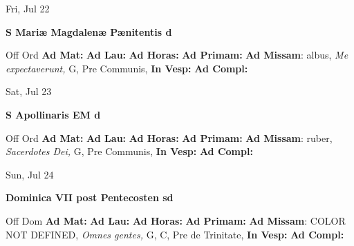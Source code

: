\documentclass[10pt]{memoir}
\begin{document}
\begin{center}
\begin{minipage}{3.5in}
\vspace{2em}
\begin{center}Fri, Jul 22
\end{center}
\textbf{ \large S Mariæ Magdalenæ Pænitentis
\textnormal{\normalsize d}}

\begin{justify}Off Ord
\textbf{Ad Mat: }
\textbf{Ad Lau: }
\textbf{Ad Horas: }
\textbf{Ad Primam: }\textbf{Ad Missam}: albus, \textit{Me expectaverunt,} G, Pre Communis, 
\textbf{In Vesp: }
\textbf{Ad Compl: }
\end{justify}
\end{minipage}
\end{center}

\begin{center}
\begin{minipage}{3.5in}
\vspace{2em}
\begin{center}Sat, Jul 23
\end{center}
\textbf{ \large S Apollinaris EM
\textnormal{\normalsize d}}

\begin{justify}Off Ord
\textbf{Ad Mat: }
\textbf{Ad Lau: }
\textbf{Ad Horas: }
\textbf{Ad Primam: }\textbf{Ad Missam}: ruber, \textit{Sacerdotes Dei,} G, Pre Communis, 
\textbf{In Vesp: }
\textbf{Ad Compl: }
\end{justify}
\end{minipage}
\end{center}

\begin{center}
\begin{minipage}{3.5in}
\vspace{2em}
\begin{center}Sun, Jul 24
\end{center}
\textbf{ \large Dominica VII post Pentecosten
\textnormal{\normalsize sd}}

\begin{justify}Off Dom
\textbf{Ad Mat: }
\textbf{Ad Lau: }
\textbf{Ad Horas: }
\textbf{Ad Primam: }\textbf{Ad Missam}: COLOR NOT DEFINED, \textit{Omnes gentes,} G, C, Pre de Trinitate, 
\textbf{In Vesp: }
\textbf{Ad Compl: }
\end{justify}
\end{minipage}
\end{center}
\end{document}
